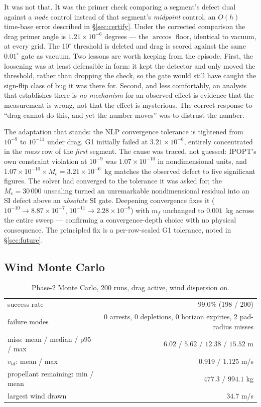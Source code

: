 \documentclass[11pt]{article}
\begin{document}
It was not that. It was the primer check comparing a segment's defect dual
against a \emph{node} control instead of that segment's \emph{midpoint}
control, an $O(h)$ time-base error described in \S\ref{sec:certify}. Under
the corrected comparison the drag primer angle is $1.21\times10^{-6}$
degrees --- the $\arccos$ floor, identical to vacuum, at every grid. The
$10^\circ$ threshold is deleted and drag is scored against the same
$0.01^\circ$ gate as vacuum. Two lessons are worth keeping from the episode.
First, the loosening was at least defensible in form: it kept the detector
and only moved the threshold, rather than dropping the check, so the gate
would still have caught the sign-flip class of bug it was there for. Second,
and less comfortably, an analysis that establishes there is \emph{no
mechanism} for an observed effect is evidence that the measurement is wrong,
not that the effect is mysterious. The correct response to ``drag cannot do
this, and yet the number moves'' was to distrust the number.

The adaptation that stands: the NLP convergence tolerance is tightened from $10^{-9}$ to
$10^{-11}$ under drag. G1 initially failed at $3.21\times10^{-6}$, entirely
concentrated in the \emph{mass} row of the \emph{first} segment. The cause
was traced, not guessed: IPOPT's own constraint violation at $10^{-9}$ was
$1.07\times10^{-10}$ in nondimensional units, and $1.07\times10^{-10}\times
M_c = 3.21\times10^{-6}$~kg matches the observed defect to five significant
figures. The solver had converged to the tolerance it was asked for; the
$M_c = 30\,000$ unscaling turned an unremarkable nondimensional residual
into an SI defect above an \emph{absolute} SI gate. Deepening convergence
fixes it ($10^{-10} \to 8.87\times10^{-7}$, $10^{-11} \to
2.28\times10^{-8}$) with $m_f$ unchanged to $0.001$~kg across the entire
sweep --- confirming a convergence-depth choice with no physical
consequence. The principled fix is a per-row-scaled G1 tolerance, noted in
\S\ref{sec:future}.

\subsection{Wind Monte Carlo}

\begin{table}[htbp]
\centering
\caption{Phase-2 Monte Carlo, 200 runs, drag active, wind dispersion on.}
\label{tab:mcd}
\begin{tabular}{lr}
\toprule
success rate & $99.0\%$ (198 / 200) \\
failure modes & 0 arrests, 0 depletions, 0 horizon expiries,
2 pad-radius misses \\
miss: mean / median / p95 / max & $6.02$ / $5.62$ / $12.38$ / $15.52$ m \\
$v_{td}$: mean / max & $0.919$ / $1.125$ m/s \\
propellant remaining: min / mean & $477.3$ / $994.1$ kg \\
largest wind drawn & $34.7$ m/s \\
\bottomrule
\end{tabular}
\end{table}
\end{document}
